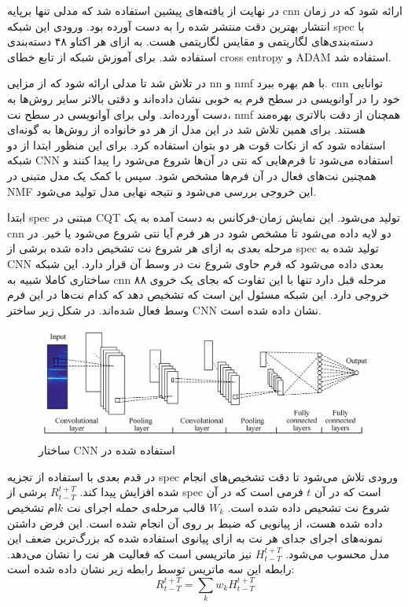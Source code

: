 در نهایت از یافته‌های پیشین استفاده شد که مدلی تنها برپایه \gls{cnn} ارائه شود
که در زمان انتشار بهترین دقت منتشر شده را به دست آورده بود. ورودی این شبکه
\gls{spec} با دسته‌بندی‌های لگاریتمی و مقایس لگاریتمی هست. به ازای هر اکتاو ۴۸
دسته‌بندی استفاده شد. برای آموزش شبکه از تابع خطای \gls{cross entropy} و ADAM
استفاده شد.

در \cite{wang2017two} تلاش شد تا مدلی ارائه شود که از مزایی \gls{nn} و \gls{nmf}
با هم بهره ببرد. \gls{cnn} توانایی خود را در آوانویسی در سطح فرم به خوبی نشان
داده‌اند و دقتی بالاتر سایر روش‌ها به دست آورده‌اند. ولی برای آوانویسی در سطح
نت، \gls{nmf} همچنان از دقت بالاتری بهره‌مند هستند. برای همین تلاش شد در این مدل
از هر دو خانواده از روش‌ها به گونه‌ای استفاده شود که از نکات قوت هر دو بتوان
استفاده کرد. برای این منظور ابتدا از دو شبکه \gls{CNN} استفاده می‌شود تا
فرم‌هایی که نتی در آن‌ها شروع می‌شود را پیدا کنند و همچنین نت‌های فعال در آن
فرم‌ها مشخص شود. سپس با کمک یک مدل متبنی در \gls{NMF} این خروجی بررسی می‌شود و
نتیجه نهایی مدل تولید می‌شود.

ابتدا \gls{spec} مبتنی در \gls{CQT} تولید می‌شود. این نمایش زمان-فرکانس به دست
آمده به یک \gls{cnn} دو لایه داده می‌شود تا مشخص شود در هر فرم آیا نتی شروع
می‌شود یا خیر. در مرحله بعدی به ازای هر شروع نت تشخیص داده شده برشی از
\gls{spec} تولید شده به \gls{CNN} بعدی داده می‌شود که فرم حاوی شروع نت در وسط آن
قرار دارد. این شبکه ساختاری کاملا شبیه به \gls{cnn} مرحله قبل دارد تنها با این
تفاوت که بجای یک خروی ۸۸ خروجی دارد. این شبکه مسئول این است که تشخیص دهد که کدام
نت‌ها در این فرم وسط فعال شده‌اند. در شکل زیر ساختر \gls{CNN} نشان داده شده است.
\begin{figure}[ht]
    \centering
    \includegraphics[width=12cm]{./statics/wang2017two_cnn.png}
    \caption{ساختار \gls{CNN} استفاده شده در \cite{wang2017two}}
\end{figure}

در قدم بعدی با استفاده از تجزیه \gls{spec} ورودی تلاش می‌شود تا دقت تشخیص‌های
انجام شده افزایش پیدا کند. $R_{t - T}^{t + T}$ برشی از \gls{spec} است که در آن
$t$ فرمی است که در آن شروع نت تشحیص داده شده است. $W_k$ قالب مرحله‌ی حمله اجرای
نت $k$ام تشخیص داده شده هست، از پیانویی که ضبط بر روی آن انجام شده است. این فرض
داشتن نمونه‌های اجرای جدای هر نت به ازای پیانوی استفاده شده که بزرگ‌ترین ضعف این
مدل محسوب می‌شود. $H_{t - T}^{t + T}$ نیز ماتریسی‌ است که فعالیت هر نت را نشان
می‌دهد. رابطه این سه ماتریس توسط رابطه زیر نشان داده شده است:
\begin{equation}
    R_{t - T}^{t + T} = \sum_{k} w_k H_{t - T}^{t + T}
\end{equation}

